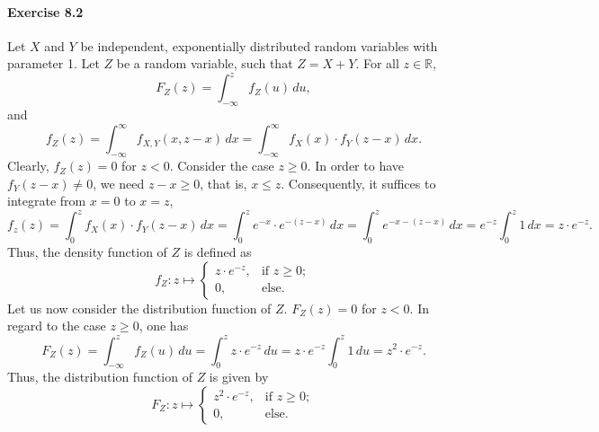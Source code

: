 \paragraph{Exercise 8.2} Let $X$ and $Y$ be independent, exponentially distributed
random variables with parameter 1. Let $Z$ be a random variable,
such that $Z = X + Y$. For all $z \in \mathbb{R}$,
\[
    F_Z(z) = \int_{- \infty}^{z} f_Z(u) \, du,
\]
and
\[
    f_Z(z)
        = \int_{- \infty}^{\infty} f_{X,Y}(x,z-x) \, dx
        = \int_{- \infty}^{\infty} f_X(x)\cdot f_Y(z-x) \, dx.
\]
Clearly, $f_Z(z) = 0$ for $z < 0$. Consider the case $z \geq 0$. In order to have
$f_Y(z-x) \not= 0$, we need $z-x \geq 0$, that is, $x \leq z$. Consequently, it
suffices to integrate from $x=0$ to $x = z$,
\[
    f_z(z)
        = \int_{0}^{z} f_X(x)\cdot f_Y(z-x) \, dx
        = \int_{0}^{z} e^{-x} \cdot e^{-(z-x)} \, dx
        = \int_{0}^{z} e^{-x-(z-x)} \, dx
        = e^{-z} \int_{0}^{z} 1 \, dx
        = z \cdot e^{-z}.
\]
Thus, the density function of $Z$ is defined as
\[
    f_Z: z \mapsto
    \begin{cases}
        z \cdot e^{-z}, &\text{if }z  \geq 0; \\
        0,  &\text{else.}
    \end{cases}
\]
Let us now consider the distribution function of $Z$. $F_Z(z) = 0$ for $z < 0$.
In regard to the case $z \geq 0$, one has
\[
    F_Z(z)
        = \int_{- \infty}^{z} f_Z(u) \, du
        = \int_{0}^{z} z \cdot e^{-z} \, du
        = z \cdot e^{-z} \int_{0}^{z} 1 \, du
        = z^2 \cdot e^{-z}.
\]
Thus, the distribution function of $Z$ is given by
\[
    F_Z: z \mapsto
    \begin{cases}
        z^2 \cdot e^{-z},   &\text{if }z \geq 0; \\
        0,                  &\text{else.}
    \end{cases}
\]
